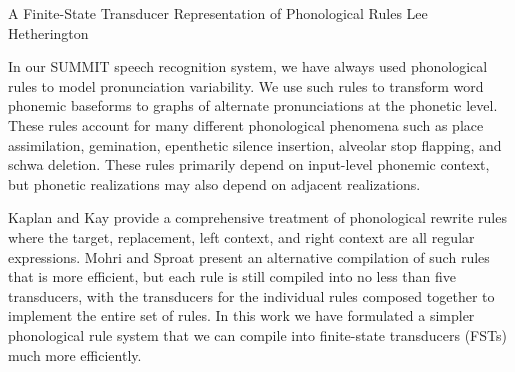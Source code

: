 

\formattitlecontents
{A Finite-State Transducer Representation of Phonological Rules}%
{Lee Hetherington}


\newenvironment{slsilhrules}%
  {\begin{center}\begin{tabular}{cccclc}}%
  {\end{tabular}\end{center}}

\newcommand{\slsilhrule}[4]{%
  \{\textit{#1}\}&\textit{#2}&\{\textit{#3}\}&$\Rightarrow$&\textit{#4}&;\\}


%

In our SUMMIT speech recognition system, we have always used
phonological rules to model pronunciation variability.  We use such
rules to transform word phonemic baseforms to graphs of alternate
pronunciations at the phonetic level.  These rules account for many
different phonological phenomena such as place assimilation,
gemination, epenthetic silence insertion, alveolar stop flapping, and
schwa deletion.  These rules primarily depend on input-level phonemic
context, but phonetic realizations may also depend on adjacent
realizations.

Kaplan and Kay \cite{Kaplan94} provide a comprehensive treatment of
phonological rewrite rules where the target, replacement, left
context, and right context are all regular expressions.  Mohri and
Sproat \cite{Mohri96} present an alternative compilation of such rules
that is more efficient, but each rule is still compiled into no less
than five transducers, with the transducers for the individual rules
composed together to implement the entire set of rules.  In this work
we have formulated a simpler phonological rule system that we can
compile into finite-state transducers (FSTs) much more efficiently.

